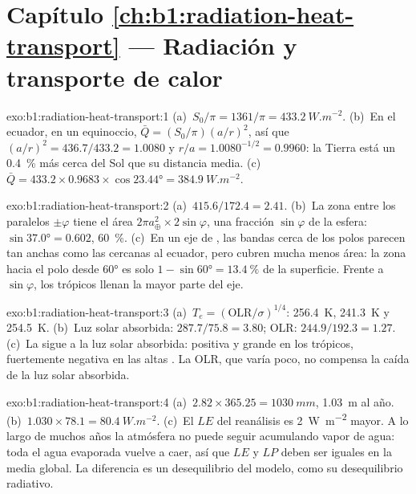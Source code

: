 \section*{Capítulo \ref{ch:b1:radiation-heat-transport} --- Radiación y transporte de calor}

\begin{solution}{exo:b1:radiation-heat-transport:1}
(a)~$S_0/\pi = 1361/\pi = \qty{433.2}{W.m^{-2}}$. (b)~En el ecuador, en un equinoccio,
$\bar Q = (S_0/\pi)(a/r)^2$, así que $(a/r)^2 = 436.7/433.2 = 1.0080$ y $r/a =
1.0080^{-1/2} = 0.9960$: la Tierra está un \qty{0.4}{\percent} más cerca del Sol que su distancia media. (c)~$\bar Q = 433.2 \times 0.9683 \times \cos\ang{23.44} =
\qty{384.9}{W.m^{-2}}$.
\end{solution}

\begin{solution}{exo:b1:radiation-heat-transport:2}
(a)~$415.6/172.4 = 2.41$. (b)~La zona entre los paralelos $\pm\varphi$ tiene
el área $2\pi a_\oplus^2 \times 2\sin\varphi$, una fracción $\sin\varphi$ de la esfera:
$\sin\ang{37.0} = 0.602$, \qty{60}{\percent}. (c)~En un eje de , las bandas cerca de los polos parecen tan anchas como las cercanas al ecuador, pero cubren mucha menos área: la zona hacia el polo desde \ang{60} es solo $1 - \sin\ang{60} =
\qty{13.4}{\percent}$ de la superficie. Frente a $\sin\varphi$, los trópicos llenan la mayor parte del eje.
\end{solution}

\begin{solution}{exo:b1:radiation-heat-transport:3}
(a)~$T_e = (\text{OLR}/\sigma)^{1/4}$: \qty{256.4}{K}, \qty{241.3}{K} y
\qty{254.5}{K}. (b)~Luz solar absorbida: $287.7/75.8 = 3.80$; OLR: $244.9/192.3 =
1.27$. (c)~La  sigue a la luz solar absorbida: positiva y grande en los trópicos, fuertemente negativa en las altas . La OLR, que varía poco, no compensa la caída de la luz solar absorbida.
\end{solution}

\begin{solution}{exo:b1:radiation-heat-transport:4}
(a)~$2.82 \times 365.25 = \qty{1030}{mm}$, \qty{1.03}{m} al año. (b)~$1.030 \times
78.1 = \qty{80.4}{W.m^{-2}}$.
(c)~El $LE$ del reanálisis es \qty{2}{W.m^{-2}} mayor. A lo largo de muchos años la atmósfera no puede seguir acumulando vapor de agua: toda el agua evaporada vuelve a caer, así que $LE$ y $LP$ deben ser iguales en la media global. La diferencia es un desequilibrio del modelo, como su desequilibrio radiativo.
\end{solution}

